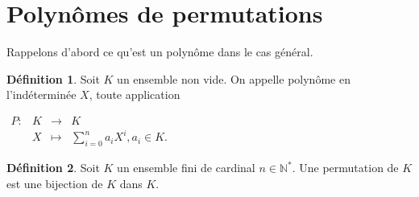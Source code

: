 \documentclass[12pt]{article}
\theoremstyle{definition}
\newtheorem{definition}{Définition}
\begin{document}
\section{Polynômes de permutations}
Rappelons d'abord ce qu'est un polynôme dans le cas général.\\ %
\begin{definition} %
Soit $K$ un ensemble non vide. On appelle polynôme en l'indéterminée $X$, toute application
\begin{center}
$
\begin{array}{l|rcl}
\displaystyle
P : & K & \longrightarrow & K \\
    & X & \longmapsto & \sum_{i=0}^n a_iX^i,  a_i \in K.
\end{array}
$
\end{center}
\end{definition}

\begin{definition}
Soit $K$ un ensemble fini de cardinal $n\in \mathbb{N}^*$. Une permutation de $K$ est une bijection de $K$ dans $K$.
\end{definition}
\end{document}
